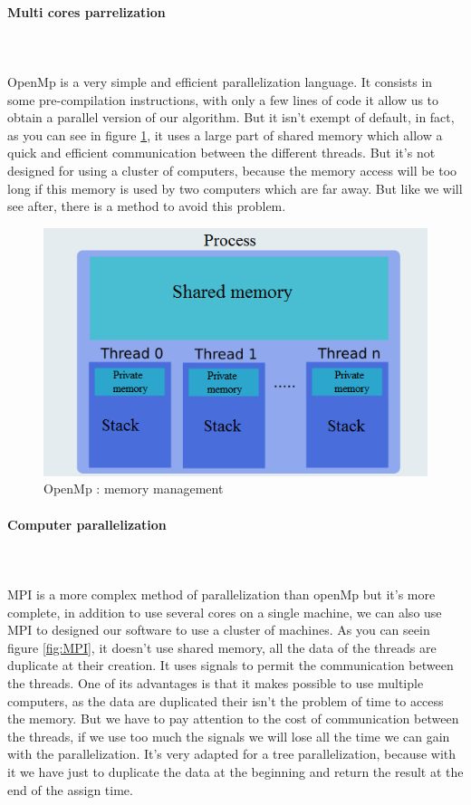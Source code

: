 \paragraph{Multi cores parrelization}\mbox{}\\\mbox{}\\
	OpenMp is a very simple and efficient parallelization language. It consists in some pre-compilation instructions, with only a few lines of code it allow us to obtain a parallel version of our algorithm. But it isn't exempt of default, in fact, as you can see in figure \ref{fig:OpenMp}, it uses a large part of shared memory which allow a quick and efficient communication between the different threads. But it's not designed for using a cluster of computers, because the memory access will be too long if this memory is used by two computers which are far away. But like we will see after, there is a method to avoid this problem.
\begin{figure}[!h] 
\centerline{\includegraphics[scale=0.50]{3_Software_considered/MultithreadingMP_boost_Visual_MPI_5000_Zotero_Project_Baptiste/OpenMP}}
   \caption{\label{étiquette} OpenMp : memory management}
\label{fig:OpenMp}
\end{figure}
\newpage
\paragraph{Computer parallelization}\mbox{}\\\mbox{}\\
	MPI is a more complex method of parallelization than openMp but it's more complete, in addition to use several cores on a single machine, we can also use MPI to designed our software to use a cluster of machines. As you can seein figure \ref{fig:MPI}, it doesn't use shared memory, all the data of the threads are duplicate at their creation. It uses signals to permit the communication between the threads. One of its advantages is that it makes possible to use multiple computers, as the data are duplicated their isn't the problem of time to access the memory. But we have to pay attention to the cost of communication between the threads, if we use too much the signals we will lose all the time we can gain with the parallelization. It's very adapted for a tree parallelization, because with it we have just to duplicate the data at the beginning and return the result at the end of the assign time.

